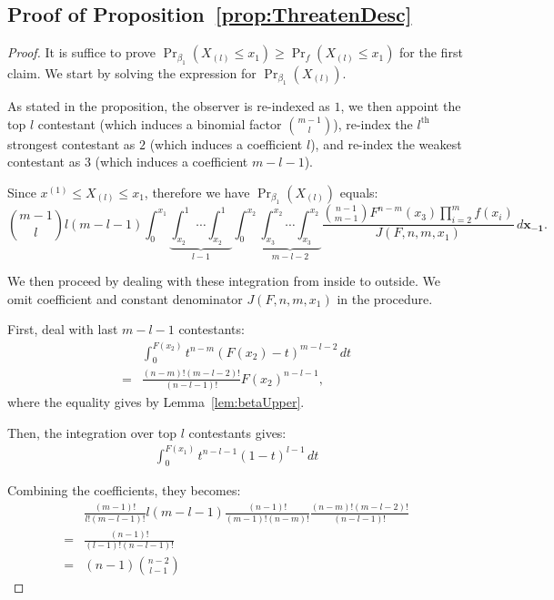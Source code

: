 \subsection*{Proof of Proposition~\ref{prop:ThreatenDesc}}
\begin{proof}
    It is suffice to prove $\Pr_{\beta_1}(X_{(l)} \leq x_1) \geq \Pr_{f}(X_{(l)}\leq x_1)$ for the first claim. We start by solving the expression for $\Pr_{\beta_1}(X_{(l)})$. 

    As stated in the proposition, the observer is re-indexed as $1$, we then appoint the top $l$ contestant (which induces a binomial factor $\binom{m-1}{l}$), re-index the $l^{\text{th}}$ strongest contestant as $2$ (which induces a coefficient $l$), and re-index the weakest contestant as $3$ (which induces a coefficient $m-l-1$). 
    
    Since $x^{(1)} \leq X_{(l)} \leq x_1$, therefore we have $\Pr_{\beta_1}(X_{(l)})$ equals: 
    \[
    \binom{m-1}{l}l(m-l-1)\int_0^{x_1}\underbrace{\int_{x_2}^1 \cdots \int_{x_2}^1}_{l-1} \int_0^{x_2} \underbrace{\int_{x_3}^{x_2} \cdots \int_{x_3}^{x_2}}_{m-l-2} \frac{\binom{n-1}{m-1}F^{n-m}(x_3)\prod_{i=2}^{m}f(x_i)}{J(F,n,m,x_1)} \, d\mathbf{x_{-1}}. 
    \]

    We then proceed by dealing with these integration from inside to outside. We omit coefficient and constant denominator $J(F,n,m,x_1)$ in the procedure.

    First, deal with last $m-l-1$ contestants:
    \[
    \begin{aligned}
    & \int_0^{F(x_2)} t^{n-m}(F(x_2)-t)^{m-l-2}\, dt \\
    = & \frac{(n-m)!(m-l-2)!}{(n-l-1)!} F(x_2)^{n-l-1},
    \end{aligned}
    \]where the equality gives by Lemma~\ref{lem:betaUpper}. 

    Then, the integration over top $l$ contestants gives:
    \[
    \begin{aligned}
        \int_0^{F(x_1)}t^{n-l-1}(1-t)^{l-1} \, dt 
    \end{aligned}
    \]

    Combining the coefficients, they becomes:
    \[
    \begin{aligned}
        & \frac{(m-1)!}{l!(m-l-1)!}l(m-l-1)\frac{(n-1)!}{(m-1)!(n-m)!}\frac{(n-m)!(m-l-2)!}{(n-l-1)!} \\
        = & \frac{(n-1)!}{(l-1)!(n-l-1)!} \\
        = & (n-1) \binom{n-2}{l-1}
    \end{aligned}
    \]


\end{proof}
